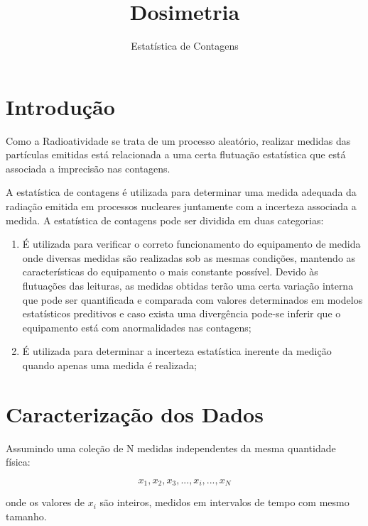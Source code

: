 \documentclass[11pt,a4paper]{article}
\title{\LobsterTwo\Huge{Dosimetria}}
\author{\LobsterTwo\Large{Estatística de Contagens\nocite{*}}}
\date{\LobsterTwo{Dalila Mendonça}}
\begin{document}
	\maketitle


\section{Introdução}

  	Como a Radioatividade se trata de um processo aleatório, realizar medidas das partículas emitidas está 	relacionada a uma certa flutuação estatística que está associada a imprecisão nas contagens.

    A estatística de contagens é utilizada para determinar uma medida adequada da radiação emitida em processos nucleares juntamente com a incerteza associada a medida. A estatística de contagens pode ser dividida em duas categorias:

        \begin{enumerate}
          \item É utilizada para verificar o correto funcionamento do equipamento de medida onde diversas medidas são realizadas sob as mesmas condições, mantendo as características do equipamento o mais constante possível. Devido às flutuações das leituras, as medidas obtidas terão uma certa variação interna que pode ser quantificada e comparada com valores determinados em modelos estatísticos preditivos e caso exista uma divergência pode-se inferir que o equipamento está com anormalidades nas contagens;
          \item É utilizada para determinar a incerteza estatística inerente da medição quando apenas uma medida é realizada; 
        \end{enumerate}
    
\section{Caracterização dos Dados}

    Assumindo uma coleção de N medidas independentes da mesma quantidade física:

        \begin{equation*}
        	x_1,x_2, x_3, ... , x_i , ... , x_N
        \end{equation*}
        
    \noindent onde os valores de $x_i$ são inteiros, medidos em intervalos de tempo com mesmo tamanho.
\end{document}
